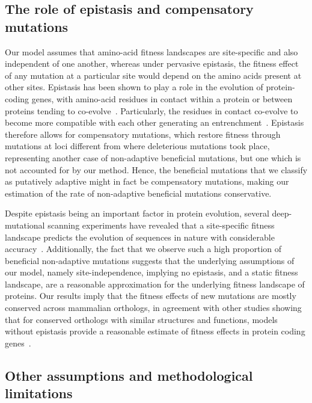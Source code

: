 \documentclass{article}
\begin{document}
    \subsection*{The role of epistasis and compensatory mutations}

    Our model assumes that amino-acid fitness landscapes are site-specific and also independent of one another, whereas under pervasive epistasis, the fitness effect of any mutation at a particular site would depend on the amino acids present at other sites.
    Epistasis has been shown to play a role in the evolution of protein-coding genes, with amino-acid residues in contact within a protein or between proteins tending to co-evolve~\cite{morcos_directcoupling_2011, marks_protein_2012, starr_epistasis_2016}.
    Particularly, the residues in contact co-evolve to become more compatible with each other generating an entrenchment~\cite{goldstein_nonadaptive_2015, goldstein_sequence_2017, park_epistatic_2022}.
    Epistasis therefore allows for compensatory mutations, which restore fitness through mutations at loci different from where deleterious mutations took place, representing another case of non-adaptive beneficial mutations, but one which is not accounted for by our method.
    Hence, the beneficial mutations that we classify as putatively adaptive might in fact be compensatory mutations, making our estimation of the rate of non-adaptive beneficial mutations conservative.

    Despite epistasis being an important factor in protein evolution, several deep-mutational scanning experiments have revealed that a site-specific fitness landscape predicts the evolution of sequences in nature with considerable accuracy~\cite{ashenberg_mutational_2013, doud_sitespecific_2015, bloom_identification_2017}.
    Additionally, the fact that we observe such a high proportion of beneficial non-adaptive mutations suggests that the underlying assumptions of our model, namely site-independence, implying no epistasis, and a static fitness landscape, are a reasonable approximation for the underlying fitness landscape of proteins.
    Our results imply that the fitness effects of new mutations are mostly conserved across mammalian orthologs, in agreement with other studies showing that for conserved orthologs with similar structures and functions, models without epistasis provide a reasonable estimate of fitness effects in protein coding genes~\cite{youssef_consequences_2020, vigue_deciphering_2022}.

    \subsection*{Other assumptions and methodological limitations}
\end{document}
